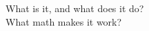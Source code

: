 \documentclass[preview]{standalone}
\begin{document}
What is it, and what does it do?\\What math makes it work?\\
\end{document}
